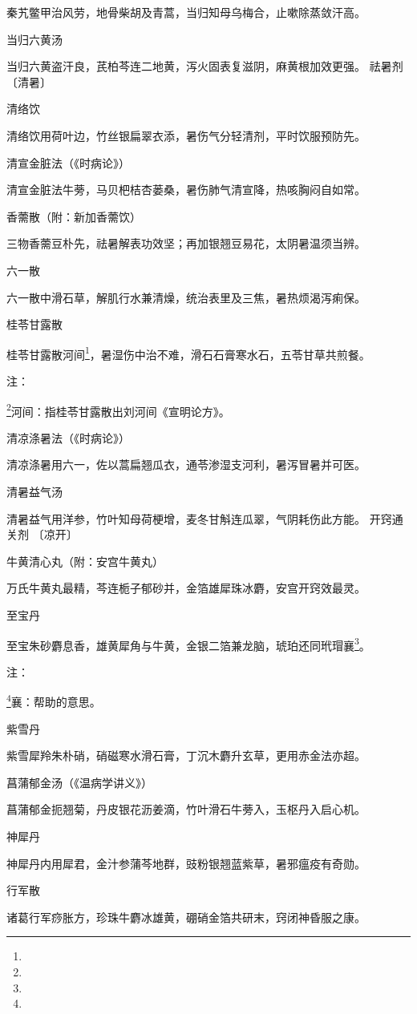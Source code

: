 \documentclass[a4paper,12pt,UTF8,twoside]{ctexbook}
\begin{document}
秦艽鳖甲治风劳，地骨柴胡及青蒿，当归知母乌梅合，止嗽除蒸敛汗高。

当归六黄汤

当归六黄盗汗良，芪柏芩连二地黄，泻火固表复滋阴，麻黄根加效更强。
祛暑剂
〔清暑〕

清络饮

清络饮用荷叶边，竹丝银扁翠衣添，暑伤气分轻清剂，平时饮服预防先。

清宣金脏法（《时病论》）

清宣金脏法牛蒡，马贝杷桔杏蒌桑，暑伤肺气清宣降，热咳胸闷自如常。

香薷散（附：新加香薷饮）

三物香薷豆朴先，祛暑解表功效坚；再加银翘豆易花，太阴暑温须当辨。

六一散

六一散中滑石草，解肌行水兼清燥，统治表里及三焦，暑热烦渴泻痢保。

桂苓甘露散

桂苓甘露散河间\footnote{}，暑湿伤中治不难，滑石石膏寒水石，五苓甘草共煎餐。

注：

\footnote{}河间：指桂苓甘露散出刘河间《宣明论方》。

清凉涤暑法（《时病论》）

清凉涤暑用六一，佐以蒿扁翘瓜衣，通苓渗湿支河利，暑泻冒暑并可医。

清暑益气汤

清暑益气用洋参，竹叶知母荷梗增，麦冬甘斛连瓜翠，气阴耗伤此方能。
开窍通关剂
〔凉开〕

牛黄清心丸（附：安宫牛黄丸）

万氏牛黄丸最精，芩连栀子郁砂并，金箔雄犀珠冰麝，安宫开窍效最灵。

至宝丹

至宝朱砂麝息香，雄黄犀角与牛黄，金银二箔兼龙脑，琥珀还同玳瑁襄\footnote{}。

注：

\footnote{}襄：帮助的意思。

紫雪丹

紫雪犀羚朱朴硝，硝磁寒水滑石膏，丁沉木麝升玄草，更用赤金法亦超。

菖蒲郁金汤（《温病学讲义》）

菖蒲郁金扼翘菊，丹皮银花沥姜滴，竹叶滑石牛蒡入，玉枢丹入启心机。

神犀丹

神犀丹内用犀君，金汁参蒲芩地群，豉粉银翘蓝紫草，暑邪瘟疫有奇勋。

行军散

诸葛行军痧胀方，珍珠牛麝冰雄黄，硼硝金箔共研末，窍闭神昏服之康。
\end{document}
